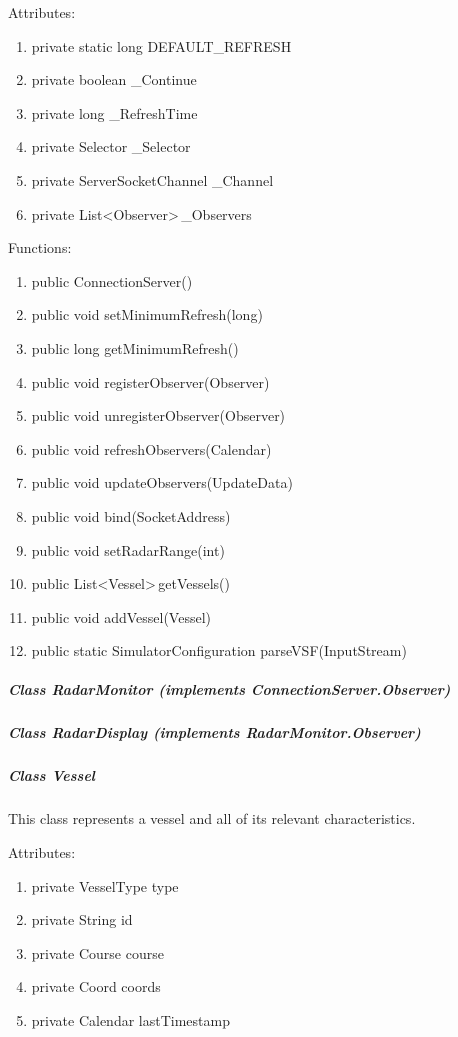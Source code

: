 \documentclass{article}
\begin{document}
Attributes:
\begin{enumerate}
	\item private static long DEFAULT\_REFRESH
    \item private boolean \_Continue
    \item private long \_RefreshTime
    \item private Selector \_Selector
    \item private ServerSocketChannel \_Channel
    \item private List\textless Observer\textgreater \,\_Observers
\end {enumerate}

\vspace{0.5cm}

Functions:
\begin{enumerate}
	\item public ConnectionServer()
	\item public void setMinimumRefresh(long)
	\item public long getMinimumRefresh()
	\item public void registerObserver(Observer)
	\item public void unregisterObserver(Observer)
	\item public void refreshObservers(Calendar)
	\item public void updateObservers(UpdateData)
	\item public void bind(SocketAddress)
	\item public void setRadarRange(int)
	\item public List\textless Vessel\textgreater \,getVessels()
	\item public void addVessel(Vessel)
	\item public static SimulatorConfiguration parseVSF(InputStream)
\end{enumerate}

\subparagraph{Class RadarMonitor (implements ConnectionServer.Observer)} %

\subparagraph{Class RadarDisplay (implements RadarMonitor.Observer)} %

\subparagraph{Class Vessel}
This class represents a vessel and all of its relevant characteristics.

\vspace{0.5cm}

Attributes:
\begin{enumerate}
	\item private VesselType type
    \item private String id
    \item private Course course
    \item private Coord coords
    \item private Calendar lastTimestamp
\end {enumerate}
\end{document}

